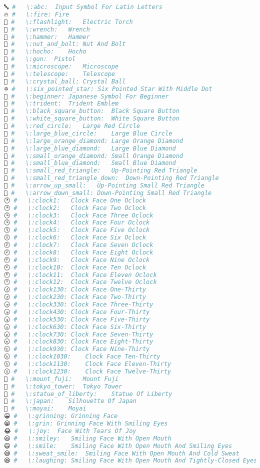 \begin{lstlisting}[language=Julia]
🔤 #   \:abc:  Input Symbol For Latin Letters
🔥 #   \:fire: Fire
🔦 #   \:flashlight:   Electric Torch
🔧 #   \:wrench:   Wrench
🔨 #   \:hammer:   Hammer
🔩 #   \:nut_and_bolt: Nut And Bolt
🔪 #   \:hocho:    Hocho
🔫 #   \:gun:  Pistol
🔬 #   \:microscope:   Microscope
🔭 #   \:telescope:    Telescope
🔮 #   \:crystal_ball: Crystal Ball
🔯 #   \:six_pointed_star: Six Pointed Star With Middle Dot
🔰 #   \:beginner: Japanese Symbol For Beginner
🔱 #   \:trident:  Trident Emblem
🔲 #   \:black_square_button:  Black Square Button
🔳 #   \:white_square_button:  White Square Button
🔴 #   \:red_circle:   Large Red Circle
🔵 #   \:large_blue_circle:    Large Blue Circle
🔶 #   \:large_orange_diamond: Large Orange Diamond
🔷 #   \:large_blue_diamond:   Large Blue Diamond
🔸 #   \:small_orange_diamond: Small Orange Diamond
🔹 #   \:small_blue_diamond:   Small Blue Diamond
🔺 #   \:small_red_triangle:   Up-Pointing Red Triangle
🔻 #   \:small_red_triangle_down:  Down-Pointing Red Triangle
🔼 #   \:arrow_up_small:   Up-Pointing Small Red Triangle
🔽 #   \:arrow_down_small: Down-Pointing Small Red Triangle
🕐 #   \:clock1:   Clock Face One Oclock
🕑 #   \:clock2:   Clock Face Two Oclock
🕒 #   \:clock3:   Clock Face Three Oclock
🕓 #   \:clock4:   Clock Face Four Oclock
🕔 #   \:clock5:   Clock Face Five Oclock
🕕 #   \:clock6:   Clock Face Six Oclock
🕖 #   \:clock7:   Clock Face Seven Oclock
🕗 #   \:clock8:   Clock Face Eight Oclock
🕘 #   \:clock9:   Clock Face Nine Oclock
🕙 #   \:clock10:  Clock Face Ten Oclock
🕚 #   \:clock11:  Clock Face Eleven Oclock
🕛 #   \:clock12:  Clock Face Twelve Oclock
🕜 #   \:clock130: Clock Face One-Thirty
🕝 #   \:clock230: Clock Face Two-Thirty
🕞 #   \:clock330: Clock Face Three-Thirty
🕟 #   \:clock430: Clock Face Four-Thirty
🕠 #   \:clock530: Clock Face Five-Thirty
🕡 #   \:clock630: Clock Face Six-Thirty
🕢 #   \:clock730: Clock Face Seven-Thirty
🕣 #   \:clock830: Clock Face Eight-Thirty
🕤 #   \:clock930: Clock Face Nine-Thirty
🕥 #   \:clock1030:    Clock Face Ten-Thirty
🕦 #   \:clock1130:    Clock Face Eleven-Thirty
🕧 #   \:clock1230:    Clock Face Twelve-Thirty
🗻 #   \:mount_fuji:   Mount Fuji
🗼 #   \:tokyo_tower:  Tokyo Tower
🗽 #   \:statue_of_liberty:    Statue Of Liberty
🗾 #   \:japan:    Silhouette Of Japan
🗿 #   \:moyai:    Moyai
😀 #   \:grinning: Grinning Face
😁 #   \:grin: Grinning Face With Smiling Eyes
😂 #   \:joy:  Face With Tears Of Joy
😃 #   \:smiley:   Smiling Face With Open Mouth
😄 #   \:smile:    Smiling Face With Open Mouth And Smiling Eyes
😅 #   \:sweat_smile:  Smiling Face With Open Mouth And Cold Sweat
😆 #   \:laughing: Smiling Face With Open Mouth And Tightly-Closed Eyes

\end{lstlisting}

